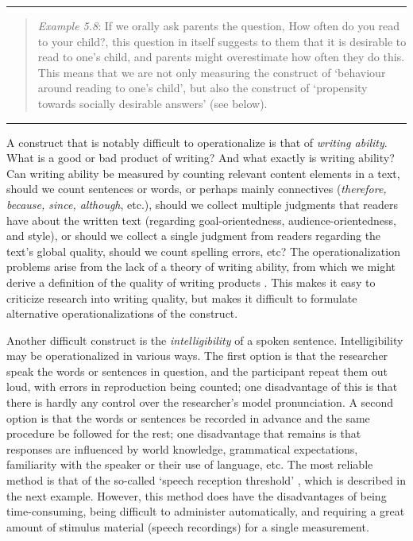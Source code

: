 \documentclass[
]{book}
\begin{document}
\begin{center}\rule{0.5\linewidth}{0.5pt}\end{center}

\begin{quote}
\emph{Example 5.8}: If we orally ask parents the question, How often do you read to your child?, this question in itself suggests to them that it is desirable to read to one's child, and parents might overestimate how often they do this. This means that we are not only measuring the construct of `behaviour around reading to one's child', but also the construct of `propensity towards socially desirable answers' (see below).
\end{quote}

\begin{center}\rule{0.5\linewidth}{0.5pt}\end{center}

A construct that is notably difficult to operationalize is that of \emph{writing ability}. What is a good or bad product of writing? And what exactly is writing ability? Can writing ability be measured by counting relevant content elements in a text, should we count sentences or words, or perhaps mainly connectives (\emph{therefore, because, since, although}, etc.), should we collect multiple judgments that readers have about the written text (regarding goal-orientedness, audience-orientedness, and style), or should we collect a single judgment from readers regarding the text's global quality, should we count spelling errors, etc? The operationalization problems arise from the lack of a theory of writing ability, from which we might derive a definition of the quality of writing products \citep{BM93}. This makes it easy to criticize research into writing quality, but makes it difficult to formulate alternative operationalizations of the construct.

Another difficult construct is the \emph{intelligibility} of a spoken sentence. Intelligibility may be operationalized in various ways. The first option is that the researcher speak the words or sentences in question, and the participant repeat them out loud, with errors in reproduction being counted; one disadvantage of this is that there is hardly any control over the researcher's model pronunciation. A second option is that the words or sentences be recorded in advance and the same procedure be followed for the rest; one disadvantage that remains is that responses are influenced by world knowledge, grammatical expectations, familiarity with the speaker or their use of language, etc. The most reliable method is that of the so-called `speech reception threshold' \citep{Plomp79}, which is described in the next example. However, this method does have the disadvantages of being time-consuming, being difficult to administer automatically, and requiring a great amount of stimulus material (speech recordings) for a single measurement.
\end{document}
